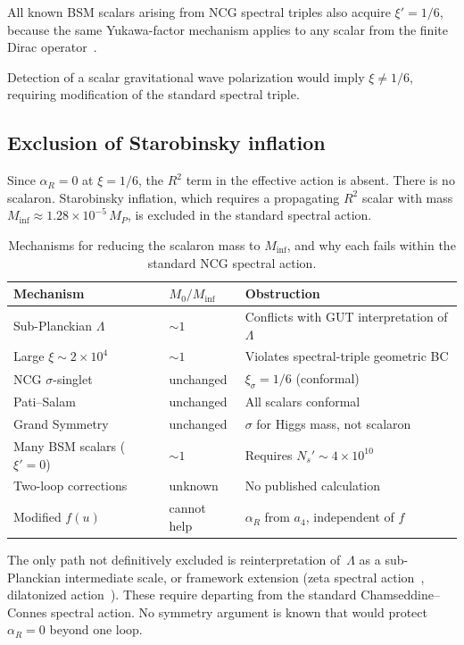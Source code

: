 \documentclass[12pt,a4paper]{article}
\theoremstyle{plain}
\theoremstyle{definition}
\theoremstyle{remark}
\begin{document}
All known BSM scalars arising from NCG spectral triples also
acquire $\xi' = 1/6$, because the same Yukawa-factor mechanism
applies to any scalar from the finite Dirac
operator~\cite{BFS:2010,CCS:2013ps,vdD:2018}.

Detection of a scalar gravitational wave polarization would
imply $\xi \neq 1/6$, requiring modification of the standard
spectral triple.

\subsection{Exclusion of Starobinsky inflation}
\label{sec:inflation}

Since $\alpha_R = 0$ at $\xi = 1/6$, the $R^2$ term in the
effective action is absent.  There is no scalaron.  Starobinsky
inflation, which requires a propagating $R^2$ scalar with mass
$M_{\mathrm{inf}} \approx 1.28 \times 10^{-5}\, M_P$, is
excluded in the standard spectral action.

\begin{table}[ht]
\centering
\caption{Mechanisms for reducing the scalaron mass to
$M_{\mathrm{inf}}$, and why each fails within the standard
NCG spectral action.}
\label{tab:inflation}
\begin{tabular}{p{3.5cm}p{2.5cm}p{5cm}}
\toprule
Mechanism & $M_0/M_{\mathrm{inf}}$ & Obstruction \\
\midrule
Sub-Planckian $\Lambda$ & $\sim 1$ &
  Conflicts with GUT interpretation of $\Lambda$ \\
Large $\xi \sim 2 \times 10^4$ & $\sim 1$ &
  Violates spectral-triple geometric BC \\
NCG $\sigma$-singlet~\cite{BFS:2010} & unchanged &
  $\xi_\sigma = 1/6$ (conformal) \\
Pati--Salam~\cite{CCS:2013ps} & unchanged &
  All scalars conformal \\
Grand Symmetry~\cite{CCS:2013gs} & unchanged &
  $\sigma$ for Higgs mass, not scalaron \\
Many BSM scalars ($\xi' = 0$) & $\sim 1$ &
  Requires $N_s' \sim 4 \times 10^{10}$ \\
Two-loop corrections & unknown &
  No published calculation \\
Modified $f(u)$ & cannot help &
  $\alpha_R$ from $a_4$, independent of $f$ \\
\bottomrule
\end{tabular}
\end{table}

The only path not definitively excluded is reinterpretation
of~$\Lambda$ as a sub-Planckian intermediate scale, or framework
extension (zeta spectral action~\cite{KLV:2015}, dilatonized
action~\cite{CC:2006dilaton}).  These require departing from the
standard Chamseddine--Connes spectral action.  No symmetry
argument is known that would protect $\alpha_R = 0$ beyond one
loop.
\end{document}
